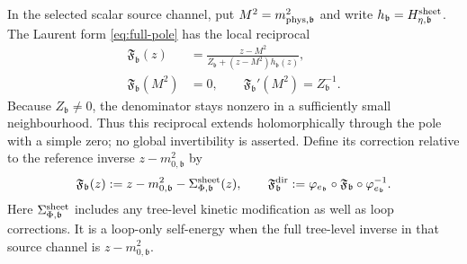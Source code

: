 \documentclass[final,5p,times,twocolumn,numbers,nopreprintline]{elsarticle}
\numberwithin{equation}{section}
\theoremstyle{definition}
\theoremstyle{remark}
\newcommand{\bb}{\mathfrak b}
\newcommand{\Ph}{\Phi}
\newcommand{\ee}{e_{\bb}}
\newcommand{\embed}{\varphi_{\ee}}
\begin{document}
In the selected scalar source channel, put
\(M^2=m_{\rm phys,\bb}^2\) and write
\(h_{\bb}=H^{\rm sheet}_{\eta,\bb}\). The Laurent form
\eqref{eq:full-pole} has the local reciprocal
\begin{equation}
 \begin{aligned}
  \mathfrak F_{\bb}(z)
    &=\frac{z-M^2}{Z_{\bb}+(z-M^2)h_{\bb}(z)},\\
  \mathfrak F_{\bb}(M^2)&=0,\qquad
  \mathfrak F_{\bb}'(M^2)=Z_{\bb}^{-1}.
 \end{aligned}
 \label{eq:local-Laurent-inverse}
\end{equation}
Because \(Z_{\bb}\ne0\), the denominator stays nonzero in a
sufficiently small neighbourhood. Thus this reciprocal extends
holomorphically through the pole with a simple zero; no global
invertibility is asserted. Define its correction relative to the
reference inverse \(z-m_{0,\bb}^2\) by
\begin{equation}
 \mathfrak F_{\bb}(z)
       :=z-m_{0,\bb}^2-\Sigma^{\rm sheet}_{\Ph,\bb}(z),
 \qquad
 \mathfrak F^{\rm dir}_{\bb}
       :=\embed\circ\mathfrak F_{\bb}\circ\embed^{-1}.
 \label{eq:Dyson-directed-inverse-function}
\end{equation}
Here \(\Sigma^{\rm sheet}_{\Ph,\bb}\) includes any tree-level
kinetic modification as well as loop corrections. It is a loop-only
self-energy when the full tree-level inverse in that source channel
is \(z-m_{0,\bb}^2\).
\end{document}
